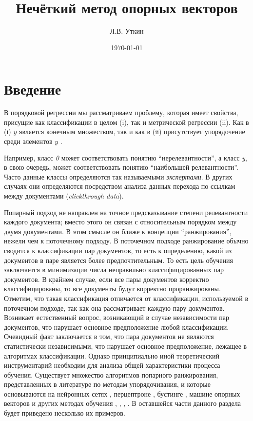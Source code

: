\documentclass[12pt,a4paper,oneside]{article}
\title{Нечёткий метод опорных векторов}
\author{Л.В. Уткин}
\date{\today}
\begin{document}

\ApplyCommonPageStyle


\section{Введение}
\label{sec:introduction}

\par
В порядковой регрессии мы рассматриваем проблему, которая имеет свойства, присущие как классификации в целом (i), так и метрической регрессии (ii). 
Как в (i) $y$ является конечным множеством, так и как в (ii) присутствует упорядочение среди элементов $y$ .

\par
Например, класс \emph{0} может соответствовать понятию ``нерелевантности'', а класс \emph{y}, в свою очередь, может  соответствовать понятию ``наибольшей релевантности''. 
Часто данные классы определяются так называемыми \emph{экспертами}. 
В других случаях они определяются посредством анализа данных перехода по ссылкам между документами (\emph{clickthrough data}).

\par
Попарный подход не направлен на точное предсказывание степени релевантности каждого документа; вместо этого он связан с относительным порядком между двумя документами. 
В этом смысле он ближе к концепции ``ранжирования'', нежели чем к поточечному подходу. 
В поточечном подходе ранжирование обычно сводится к классификации пар документов, то есть к определению, какой из документов в паре является более предпочтительным.
То есть цель обучения заключается в минимизации числа неправильно классифицированных пар документов. 
В крайнем случае, если все пары документов корректно классифицированы, то все документы будут корректно проранжированы. 
Отметим, что такая классификация отличается от классификации, используемой в поточечном подходе, так как она рассматривает каждую пару документов. 
Возникает естественный вопрос, возникающий в случае независимости пар документов, что нарушает основное предположение любой классификации. 
Очевидный факт заключается в том, что пара документов не являются статистически независимыми, что нарушает основное предположение, лежащее в алгоритмах классификации.  
Однако принципиально иной теоретический инструментарий необходим для анализа общей характеристики процесса обучения. 
Существует множество алгоритмов попарного ранжирования, представленных в литературе по методам упорядочивания, и которые основываются на нейронных сетях , перцептроне  , бустинге , машине опорных векторов   и других методах обучения , , , .
В оставшейся части данного раздела будет приведено несколько их примеров. 
\end{document}
